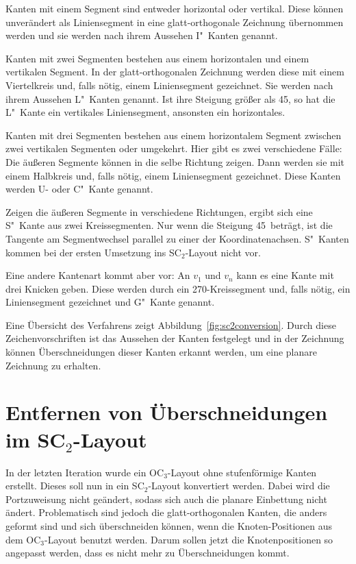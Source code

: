 \documentclass[a4paper]{scrreprt}
\theoremstyle{definition}
\begin{document}
Kanten mit einem Segment sind entweder horizontal oder vertikal. Diese können unverändert als Liniensegment in eine glatt-orthogonale Zeichnung übernommen werden und sie werden nach ihrem Aussehen I"~Kanten genannt.

Kanten mit zwei Segmenten bestehen aus einem horizontalen und einem vertikalen Segment. In der glatt-orthogonalen Zeichnung werden diese mit einem Viertelkreis und, falls nötig, einem Liniensegment gezeichnet. Sie werden nach ihrem Aussehen L"~Kanten genannt. Ist ihre Steigung größer als 45\textdegree, so hat die L"~Kante ein vertikales Liniensegment, ansonsten ein horizontales.

Kanten mit drei Segmenten bestehen aus einem horizontalem Segment zwischen zwei vertikalen Segmenten oder umgekehrt. Hier gibt es zwei verschiedene Fälle: Die äußeren Segmente können in die selbe Richtung zeigen. Dann werden sie mit einem Halbkreis und, falls nötig, einem Liniensegment gezeichnet. Diese Kanten werden U- oder C"~Kante genannt.

Zeigen die äußeren Segmente in verschiedene Richtungen, ergibt sich eine S"~Kante aus zwei Kreissegmenten. Nur wenn die Steigung 45\textdegree\ beträgt, ist die Tangente am Segmentwechsel parallel zu einer der Koordinatenachsen. S"~Kanten kommen bei der ersten Umsetzung ins SC$_2$-Layout nicht vor.

Eine andere Kantenart kommt aber vor: An $v_1$ und $v_n$ kann es eine Kante mit drei Knicken geben. Diese werden durch ein 270\textdegree-Kreissegment und, falls nötig, ein Liniensegment gezeichnet und G"~Kante genannt.

Eine Übersicht des Verfahrens zeigt Abbildung~\ref{fig:sc2conversion}. Durch diese Zeichenvorschriften ist das Aussehen der Kanten festgelegt und in der Zeichnung können Überschneidungen dieser Kanten erkannt werden, um eine planare Zeichnung zu erhalten.

\section{Entfernen von Überschneidungen im SC$_2$-Layout}
\label{sec:sc2makePlanarAlgo}

In der letzten Iteration wurde ein OC$_3$-Layout ohne stufenförmige Kanten erstellt. Dieses soll nun in ein SC$_2$-Layout konvertiert werden. Dabei wird die Portzuweisung nicht geändert, sodass sich auch die planare Einbettung nicht ändert. Problematisch sind jedoch die glatt-orthogonalen Kanten, die anders geformt sind und sich überschneiden können, wenn die Knoten-Positionen aus dem OC$_3$-Layout benutzt werden. Darum sollen jetzt die Knotenpositionen so angepasst werden, dass es nicht mehr zu Überschneidungen kommt.
\end{document}
